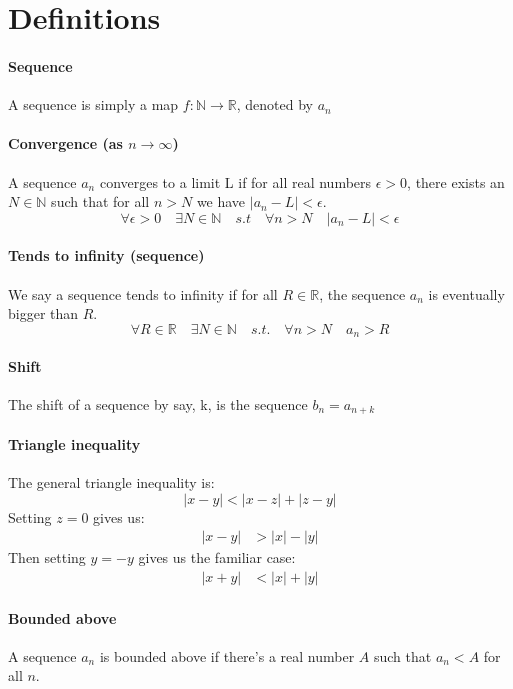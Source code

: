 \documentclass{article}
\newcommand{\R}{\mathbb{R}}
\newcommand{\N}{\mathbb{N}}
\begin{document}
\section{Definitions}
\paragraph{Sequence}
A sequence is simply a map $ f: \N \to \R $, denoted by $ a_{n} $
\paragraph{Convergence (as $ n \to \infty $)}
A sequence $ a_{n} $ converges to a limit L if for all real numbers $ \epsilon > 0 $, there exists an $ N \in \N $ such that for all $ n > N $ we have $ |a_{n} - L| < \epsilon $.
\begin{equation}
\forall \epsilon > 0 \quad \exists N \in \N \quad s.t \quad \forall n > N \quad |a_{n} - L| < \epsilon
\end{equation}
\paragraph{Tends to infinity (sequence)}
We say a sequence tends to infinity if for all $ R \in \R $, the sequence $ a_{n} $ is eventually bigger than $ R $.
\begin{equation}
\forall R \in \R \quad \exists N \in \N \quad s.t. \quad \forall n > N \quad a_{n} > R
\end{equation}
\paragraph{Shift}
The shift of a sequence by say, k, is the sequence $ b_{n} = a_{n + k} $
\paragraph{Triangle inequality}
The general triangle inequality is:
\begin{equation}
|x - y| < |x - z| + |z - y|
\end{equation}
Setting $ z = 0 $ gives us:
\begin{align}
|x - y| & > |x| - |y|
\end{align}
Then setting $ y = - y $ gives us the familiar case:
\begin{align}
|x + y| & < |x| + |y|
\end{align}
\paragraph{Bounded above}
A sequence $ a_{n} $ is bounded above if there's a real number $ A $ such that $ a_{n} < A $ for all $ n $.
\end{document}
